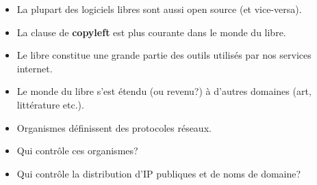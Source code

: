 \begin{slide}
	\begin{itemize}
		\item La plupart des logiciels libres sont aussi open source (et vice-versa).
		\item La clause de \textbf{copyleft} est plus courante dans le monde du libre.
		\item Le libre constitue une grande partie des outils utilisés par nos services internet.
		\item Le monde du libre s'est étendu (ou revenu?) à d'autres domaines (art, littérature etc.).
	\end{itemize}
\end{slide}

\begin{slide}
	\begin{itemize}
		\item Organismes définissent des protocoles réseaux.
		\item Qui contrôle ces organismes?
		\item Qui contrôle la distribution d'IP publiques et de noms de domaine?
	\end{itemize}
\end{slide}
